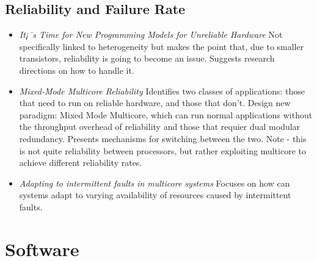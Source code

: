 \subsection{Reliability and Failure Rate}
\begin{itemize}
\item \emph{It¡¯s Time for New Programming Models for Unreliable Hardware }
Not specifically linked to heterogeneity but makes the point that, due
to smaller transistors, reliability is going to become an issue. Suggests
research directions on how to handle it.
\item \emph{Mixed-Mode Multicore Reliability} Identifies two classes
of applications: those that need to run on reliable hardware, and those
 that don't. Design new paradigm: Mixed Mode Multicore, which can
run normal applications without the throughput overhead of reliability
and those that requier dual modular redundancy. Presents mechanisms
for switching between the two. Note - this is not quite
reliability between processors, but rather exploiting multicore
to achieve different reliability rates.
\item \emph{Adapting to intermittent faults in multicore systems}
Focuses on how can systems adapt to varying availability of resources
caused by intermittent faults.
\end{itemize}

\section{Software}

